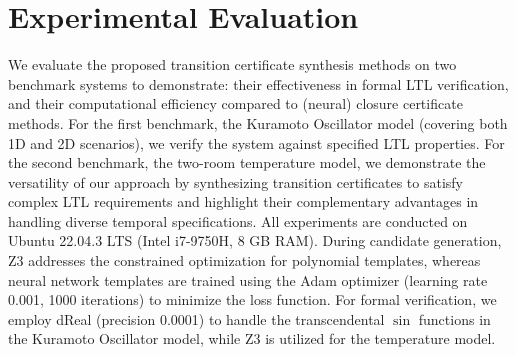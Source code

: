 \section{Experimental Evaluation}
\label{sec:experiments}


We evaluate the proposed transition certificate synthesis methods on two benchmark systems to demonstrate: their effectiveness in formal LTL verification, and their computational efficiency compared to  (neural) closure certificate methods. For the first benchmark, the Kuramoto Oscillator model (covering both 1D and 2D scenarios), we verify the system against specified LTL properties. For the second benchmark, the two-room temperature model, we demonstrate the versatility of our approach by synthesizing transition certificates to satisfy complex LTL requirements and highlight their complementary advantages in handling diverse temporal specifications. All experiments are conducted on Ubuntu 22.04.3 LTS (Intel i7-9750H, 8 GB RAM). During candidate generation, Z3 addresses the constrained optimization for polynomial templates, whereas neural network templates are trained using the Adam optimizer (learning rate 0.001, 1000 iterations) to minimize the loss function. For formal verification, we employ dReal (precision 0.0001) to handle the transcendental $\sin$ functions in the Kuramoto Oscillator model, while Z3 is utilized for the temperature model. 

